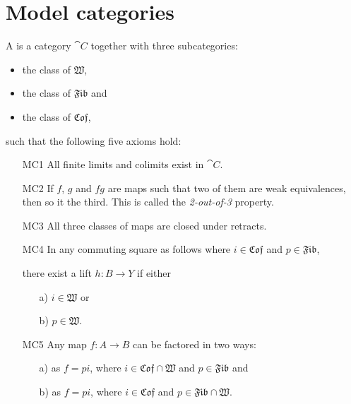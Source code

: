 
\section{Model categories}
\label{sec:model_categories}

\newcommand{\W}{\mathfrak{W}}
\newcommand{\Fib}{\mathfrak{Fib}}
\newcommand{\Cof}{\mathfrak{Cof}}

\begin{definition}
	A  is a category $\cat{C}$ together with three subcategories:
	\begin{itemize}
		\item the class of  $\W$,
		\item the class of  $\Fib$ and
		\item the class of  $\Cof$,
	\end{itemize}
	such that the following five axioms hold:
	\begin{itemize}
		\item[MC1] All finite limits and colimits exist in $\cat{C}$.
		\item[MC2] If $f$, $g$ and $fg$ are maps such that two of them are weak equivalences, then so it the third. This is called the \emph{2-out-of-3} property.
		\item[MC3] All three classes of maps are closed under retracts.
		\item[MC4] In any commuting square as follows where $i \in \Cof$ and $p \in \Fib$,
			\begin{center}
			\end{center}

			there exist a lift $h: B \to Y$ if either 
			\begin{itemize}
				\item[a)] $i \in \W$ or
				\item[b)] $p \in \W$.
			\end{itemize}
		\item[MC5] Any map $f : A \to B$ can be factored in two ways:
			\begin{itemize}
				\item[a)] as $f = pi$, where $i \in \Cof \cap \W$ and $p \in \Fib$ and
				\item[b)] as $f = pi$, where $i \in \Cof$ and $p \in \Fib \cap \W$.
			\end{itemize}
	\end{itemize}
\end{definition}

